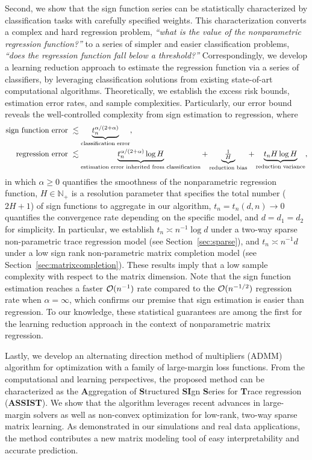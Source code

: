 \documentclass[aos]{imsart}
\theoremstyle{definition}
\newcommand*{\KeepStyleUnderBrace}[1]{%
\mathop{%
\mathchoice
{\underbrace{\displaystyle#1}}%
{\underbrace{\textstyle#1}}%
{\underbrace{\scriptstyle#1}}%
{\underbrace{\scriptscriptstyle#1}}%
}\limits
}
\def\NonparaM{\text{\bf \footnotesize ASSIST }}
\begin{document}
Second, we show that the sign function series can be statistically characterized by classification tasks with carefully specified weights. This characterization converts a complex and hard regression problem, \emph{``what is the value of the nonparametric regression function?''} to a series of simpler and easier classification problems, \emph{``does the regression function fall below a threshold?''} Correspondingly, we develop a learning reduction approach to estimate the regression function via a series of classifiers, by leveraging classification solutions from existing state-of-art computational algorithms. Theoretically, we establish the excess risk bounds, estimation error rates, and sample complexities. Particularly, our error bound reveals the well-controlled complexity from sign estimation to regression, where 
\vspace{-0.01in}
\begin{align*}
\text{sign function error }& \lesssim \KeepStyleUnderBrace{t_n^{\alpha/( 2+\alpha)}}_{\text{classification error}},\\
\text{regression error } & \lesssim  \KeepStyleUnderBrace{t_n^{\alpha/(2+\alpha)}\log H}_{\text{estimation error inherited from classification}}+\KeepStyleUnderBrace{\textstyle{1\over H}}_{\text{reduction bias}}+\KeepStyleUnderBrace{t_nH\log H}_{\text{reduction variance}},
\end{align*}
in which $\alpha\geq 0$ quantifies the smoothness of the nonparametric regression function, $H\in\mathbb{N}_{+}$ is a resolution parameter that specifies the total number ($2H+1$) of sign functions to aggregate in our algorithm, $t_n=t_n(d,n)\to 0$ quantifies the convergence rate depending on the specific model, and $d=d_1=d_2$ for simplicity. In particular, we establish $t_n\asymp n^{-1}\log d$ under a two-way sparse non-parametric trace regression model (see Section~\ref{sec:sparse}), and $t_n \asymp n^{-1}d$ under a low sign rank non-parametric matrix completion model (see Section~\ref{sec:matrixcompletion}). These results imply that a low sample complexity with respect to the matrix dimension. Note that the sign function estimation reaches a faster $\mathcal{O}(n^{-1})$ rate compared to the $\mathcal{O}(n^{-1/2})$ regression rate when $\alpha= \infty$, which confirms our premise that sign estimation is easier than regression. To our knowledge, these statistical guarantees are among the first for the learning reduction approach in the context of nonparametric matrix regression. 

Lastly, we develop an alternating direction method of multipliers (ADMM) algorithm for optimization with a family of large-margin loss functions. From the computational and learning perspectives, the proposed method can be characterized as the {\bf \small  A}ggregation of {\bf \small  S}tructured {\bf \small  SI}gn {\bf \small  S}eries for {\bf \small T}race regression ({\bf \footnotesize ASSIST}). We show that the \NonparaM algorithm leverages recent advances in large-margin solvers as well as non-convex optimization for low-rank, two-way sparse matrix learning. As demonstrated in our simulations and real data applications, the \NonparaM method contributes a new matrix modeling tool of easy interpretability and accurate prediction. 
\end{document}
